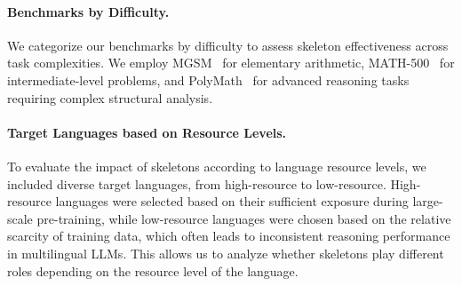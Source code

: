 \paragraph{Benchmarks by Difficulty.} 
We categorize our benchmarks by difficulty to assess skeleton effectiveness across task complexities. We employ MGSM~\citep{shi2022language} for elementary arithmetic, MATH-500~\citep{lightman2023let} for intermediate-level problems, and PolyMath~\citep{wang2025polymath} for advanced reasoning tasks requiring complex structural analysis.

\paragraph{Target Languages based on Resource Levels.} To evaluate the impact of skeletons according to language resource levels, we included diverse target languages, from high-resource to low-resource. High-resource languages were selected based on their sufficient exposure during large-scale pre-training, while low-resource languages were chosen based on the relative scarcity of training data, which often leads to inconsistent reasoning performance in multilingual LLMs. This allows us to analyze whether skeletons play different roles depending on the resource level of the language.

